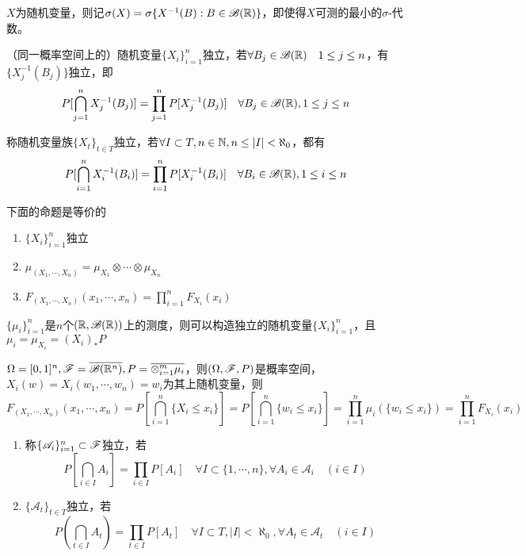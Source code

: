 \documentclass{ctexart}
\begin{document}
$X$为随机变量，则记$\sigma(X)=\sigma\{X^{-1}(B):B\in \mathscr{B}(\mathbb{R})\}$，即使得$X$可测的最小的$\sigma$-代数。

\begin{Def}[随机变量的独立性]
  （同一概率空间上的）随机变量$\{X_{i}\}_{i=1}^{n}$独立，若$\forall B_{j}\in\mathscr{B}(\mathbb{R})\quad 1\leq j\leq n$，有$\{X_{j}^{-1}(B_{j})\}$独立，即
  \[P[\bigcap_{j=1}^{n}X_{j}^{-1}(B_{j})]=\prod_{j=1}^{n}P[X_{j}^{-1}(B_{j})]\quad \forall B_{j}\in\mathscr{B}(\mathbb{R}), 1\leq j\leq n\]

  称随机变量族$\{X_{t}\}_{t\in T}$独立，若$\forall I\subset T, n\in\mathbb{N}, n\leq |I|<\aleph_{0}$，都有
 \[P[\bigcap_{i=1}^{n}X_{i}^{-1}(B_{i})]=\prod_{i=1}^{n}P[X_{i}^{-1}(B_{i})]\quad \forall B_{i}\in\mathscr{B}(\mathbb{R}), 1\leq i\leq n\]
\end{Def}

\begin{Prop}
  下面的命题是等价的
  \begin{enumerate}
  \item $\{X_{i}\}_{i=1}^{n}$独立
  \item $\mu_{(X_{1},\cdots,X_{n})}=\mu_{X_{1}}\otimes\cdots\otimes \mu_{X_{n}}$
  \item $F_{(X_{1},\cdots,X_{n})}(x_{1},\cdots,x_{n})=\prod_{i=1}^{n}F_{X_{i}}(x_{i})$
  \end{enumerate}
\end{Prop}

\begin{Eg}
  $\{\mu_{i}\}_{i=1}^{n}$是$n$个$(\mathbb{R},\mathscr{B}(\mathbb{R}))$上的测度，则可以构造独立的随机变量$\{X_{i}\}_{i=1}^{n}$，且$\mu_{i}=\mu_{X_{i}}=(X_{i})_{*}P$

  $\Omega=[0,1]^{n},\mathscr{F}=\overline{\mathscr{B}(\mathbb{R}^{n})}, P=\overline{\otimes_{i=1}^{m}\mu_{i}}$，则$(\Omega,\mathscr{F},P)$是概率空间，$X_{i}(w)=X_{i}(w_{1},\cdots,w_{n})=w_{i}$为其上随机变量，则
  \[F_{(X_{1},\cdots,X_{n})}(x_{1},\cdots,x_{n})=P[\bigcap_{i=1}^{n}\{X_{i}\leq x_{i}\}]=P[\bigcap_{i=1}^{n}\{w_{i}\leq x_{i}\}]=\prod_{i=1}^{n}\mu_{i}(\{w_{i}\leq x_{i}\})=\prod_{i=1}^{n}F_{X_{i}}(x_{i})\]
\end{Eg}

\newcommand{\A}{\mathscr{A}}

\begin{Def}[事件系族的独立性]
  \begin{enumerate}
  \item 称$\{\A_{i}\}_{i=1}^{n}\subset \F$独立，若
    \[P[\bigcap_{i\in I}A_{i}]=\prod_{i\in I}P[A_{i}]\quad \forall I\subset\{1,\cdots, n\},\forall A_{i}\in\A_{i}\quad (i\in I)\]
\item $\{\A_{t}\}_{t\in T}$独立，若\[P(\bigcap_{t\in I}A_{t})=\prod_{t\in I} P[A_{t}]\quad \forall I\subset T, |I|<\aleph_{0}, \forall A_{t}\in\A_{t}\quad(i\in I)\]
  \end{enumerate}
\end{Def}
\end{document}

